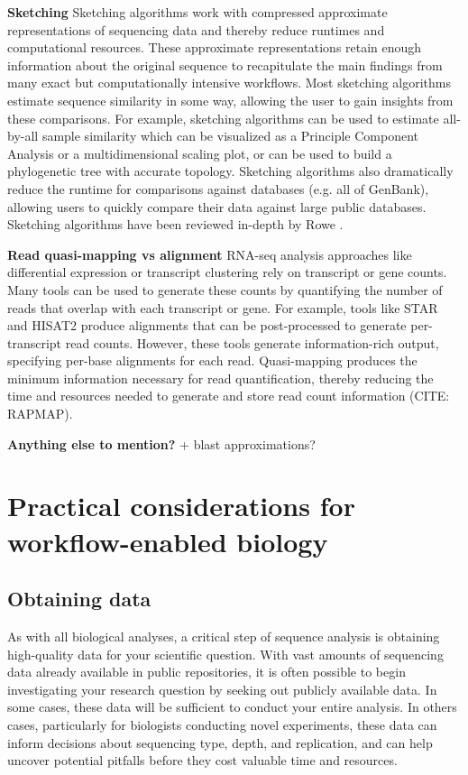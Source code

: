 \documentclass[10pt,letterpaper]{article}
\begin{document}
\textbf{Sketching} Sketching algorithms work with compressed approximate representations of sequencing data and thereby reduce runtimes and computational resources. 
These approximate representations retain enough information about the original sequence to recapitulate the main findings from many exact but computationally intensive workflows. 
Most sketching algorithms estimate sequence similarity in some way, allowing the user to gain insights from these comparisons.
For example, sketching algorithms can be used to estimate all-by-all sample similarity which can be visualized as a Principle Component Analysis or a multidimensional scaling plot, or can be used to build a phylogenetic tree with accurate topology. 
Sketching algorithms also dramatically reduce the runtime for comparisons against databases (e.g. all of GenBank), allowing users to quickly compare their data against large public databases. 
Sketching algorithms have been reviewed in-depth by Rowe \cite{rowe2019streaming}.

\textbf{Read quasi-mapping vs alignment} RNA-seq analysis approaches like differential expression or transcript clustering rely on transcript or gene counts.
Many tools can be used to generate these counts by quantifying the number of reads that overlap with each transcript or gene.
For example, tools like STAR and HISAT2 produce alignments that can be post-processed to generate per-transcript read counts.
However, these tools generate information-rich output, specifying per-base alignments for each read.
Quasi-mapping produces the minimum information necessary for read quantification, thereby reducing the time and resources needed to generate and store read count information (CITE: RAPMAP). 

\textbf{Anything else to mention?}  
+ blast approximations?


\section*{Practical considerations for workflow-enabled biology}

\subsection*{Obtaining data}

As with all biological analyses, a critical step of sequence analysis is obtaining high-quality data for your scientific question. 
With vast amounts of sequencing data already available in public repositories, it is often possible to begin investigating your research question by seeking out publicly available data. 
In some cases, these data will be sufficient to conduct your entire analysis. 
In others cases, particularly for biologists conducting novel experiments, these data can inform decisions about sequencing type, depth, and replication, and can help uncover potential pitfalls before they cost valuable time and resources.
\end{document}
